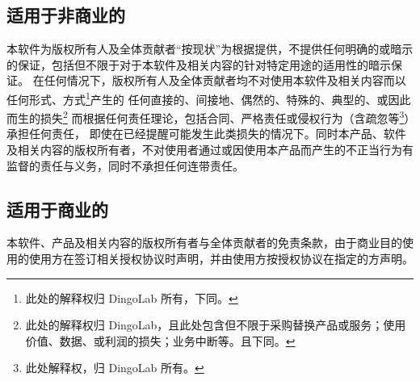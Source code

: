   \subsection{适用于非商业的}
  本软件为版权所有人及全体贡献者“按现状”为根据提供，不提供任何明确的或暗示的保证，包括但不限于对于本软件及相关内容的针对特定用途的适用性的暗示保证。
  在任何情况下，版权所有人及全体贡献者均不对使用本软件及相关内容而以任何形式、方式\footnote{此处的解释权归 DingoLab 所有，下同。}产生的
  任何直接的、间接地、偶然的、特殊的、典型的、或因此而生的损失\footnote{此处的解释权归 DingoLab，且此处包含但不限于采购替换产品或服务；使用价值、数据、或利润的损失；业务中断等。且下同。}
  而根据任何责任理论，包括合同、严格责任或侵权行为（含疏忽等\footnote{此处解释权，归 DingoLab 所有。}）承担任何责任，
  即使在已经提醒可能发生此类损失的情况下。同时本产品、软件及相关内容的版权所有者，不对使用者通过或因使用本产品而产生的不正当行为有监督的责任与义务，同时不承担任何连带责任。
  \subsection{适用于商业的}
  本软件、产品及相关内容的版权所有者与全体贡献者的免责条款，由于商业目的使用的使用方在签订相关授权协议时声明，并由使用方按授权协议在指定的方声明。

